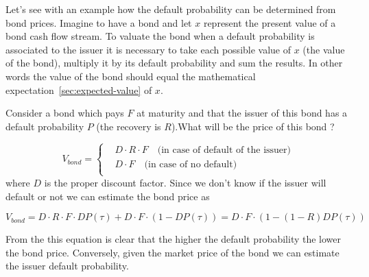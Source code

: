 Let's see with an example how the default probability can be determined
from bond prices. Imagine to have a bond and let \(x\) represent the
present value of a bond cash flow stream.
To valuate the bond when a default probability is associated to 
the issuer it is necessary to take each possible value of $x$ (the value of the bond), multiply it by its default probability and sum the results. 
In other words the value of the
bond should equal the mathematical expectation~\ref{sec:expected-value} of $x$.

Consider a bond which pays $F$ at maturity and that the issuer of this
bond has a default probability $P$ (the recovery is
$R$).What will be the price of this bond ?

\begin{equation}
V_{bond} =
\begin{cases}
& D \cdot R \cdot F\quad\textrm{(in case of default of the issuer)}\\
&D \cdot F\quad\textrm{(in case of no default)}\\
\end{cases}\end{equation} 
where \(D\) is the proper discount factor. Since we don't
know if the issuer will default or not we can estimate the bond price as

\begin{equation}
V_{bond} = D \cdot R \cdot F \cdot DP ( \tau ) + D \cdot F \cdot ( 1 − DP ( \tau)) = D\cdot F \cdot ( 1 − ( 1 − R ) DP ( \tau ))\end{equation}

From the this equation is clear that the higher the default probability
the lower the bond price. Conversely, given the market price of the
bond we can estimate the issuer default probability.

%


